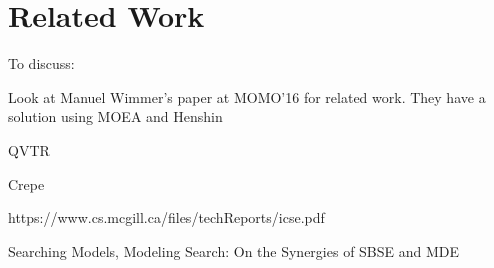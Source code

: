 \section{Related Work}
\label{section:related_work}

	\begin{draftlist}
		To discuss:
		\item Look at Manuel Wimmer's paper at MOMO'16 for related work. They have a solution using MOEA and Henshin
		\item QVTR
		\item Crepe
		\item https://www.cs.mcgill.ca/files/techReports/icse.pdf
		\item Searching Models, Modeling Search: On the Synergies of SBSE and MDE %
	\end{draftlist}
